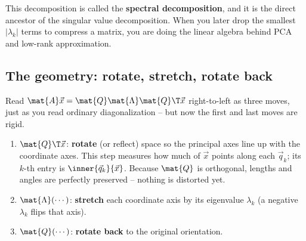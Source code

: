This decomposition is called the \textbf{spectral decomposition}, and it is the
direct ancestor of the singular value decomposition. When you later drop the
smallest $|\lambda_k|$ terms to compress a matrix, you are doing the linear algebra
behind PCA and low-rank approximation.

\subsection{The geometry: rotate, stretch, rotate back}
\label{ch26:rotate-stretch}

Read $\mat{A}\vec{x} = \mat{Q}\mat{\Lambda}\mat{Q}\T\vec{x}$ right-to-left as three
moves, just as you read ordinary diagonalization -- but now the first and last
moves are rigid.

\begin{enumerate}
  \item $\mat{Q}\T\vec{x}$: \textbf{rotate} (or reflect) space so the principal
        axes line up with the coordinate axes. This step measures how much of
        $\vec{x}$ points along each $\vec{q}_k$; its $k$-th entry is
        $\inner{\vec{q}_k}{\vec{x}}$. Because $\mat{Q}$ is orthogonal, lengths and
        angles are perfectly preserved -- nothing is distorted yet.
  \item $\mat{\Lambda}(\cdots)$: \textbf{stretch} each coordinate axis by its
        eigenvalue $\lambda_k$ (a negative $\lambda_k$ flips that axis).
  \item $\mat{Q}(\cdots)$: \textbf{rotate back} to the original orientation.
\end{enumerate}

